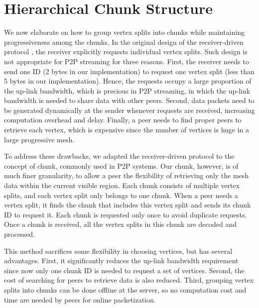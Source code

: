 \section{Hierarchical Chunk Structure}
\label{s:chunk}
We now elaborate on how to group vertex splits into chunks while maintaining
progressiveness among the chunks.
    In the original design of the receiver-driven protocol \cite{Cheng2008}, 
    the receiver explicitly requests individual vertex splits.
    Such design is not appropriate for P2P streaming for three reasons. 
    First, %
    the receiver needs to send one ID (2 bytes in our implementation)
    to request one vertex split (less than 5 bytes in our
    implementation).
    Hence, the requests occupy a large proportion of the up-link bandwidth,
    which is precious in P2P streaming, in which the up-link bandwidth
    is needed to share data with other peers. 
    Second, data packets need to be generated dynamically at the
    sender whenever requests are received, increasing
    computation overhead and delay. 
    Finally, a peer needs to find proper
    peers to retrieve each vertex, which is expensive since the 
    number of vertices is huge in a large progressive mesh.

    To address these drawbacks, we adapted the receiver-driven
    protocol to the concept of chunk, commonly used in P2P systems.
    Our chunk, however, is of much finer granularity, to allow a peer
    the flexibility of retrieving only the %
    mesh data within the current visible region.
    Each chunk consists of multiple vertex splits, and each vertex
    split only belongs to one chunk. When a peer needs a vertex split,
    it finds the chunk that includes this vertex split and sends its
    chunk ID to request it. Each chunk is requested only once to avoid
    duplicate requests.
    Once a chunk is received, 
    all the vertex splits in this chunk are decoded and processed.
    
    This method sacrifices some flexibility in choosing vertices,
    but has several advantages. First, 
    it significantly reduces the up-link bandwidth requirement since
    now only one chunk ID is needed to request a set of vertices.
    Second, the cost of searching for peers to retrieve data is also reduced.
    Third, grouping vertex splits into chunks can be done offline at
    the server, so no computation cost and time are needed by peers 
    for online packetization. 
    
